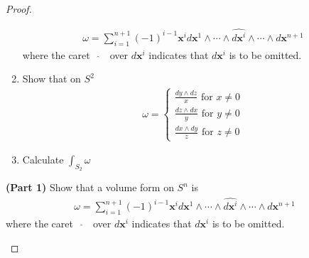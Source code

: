 \documentclass{report}
\begin{document}
\begin{proof}
\begin{question}{}{}
\begin{enumerate}[label=(\alph*)]
\begin{align*}
    \omega = \sum_{i=1}^{n+1}(-1)^{i-1}\textbf{x}^i d\textbf{x}^1 \wedge \cdots \wedge  \widehat{d\textbf{x}^i} \wedge  \cdots \wedge d\textbf{x}^{n+1}       
    \end{align*}
  where the caret $\text{  }\widehat{}\text{  }$ over $d\textbf{x}^i$ indicates that $d\textbf{x}^i$ is to be omitted. 
  \item Show that on $S^2$ 
 \begin{align*}
 \omega= \begin{cases}
   \frac{dy \wedge  dz}{x}\text{ for }x\neq 0\\
   \frac{dz \wedge  dx}{y}\text{ for }y\neq 0\\
   \frac{dx \wedge  dy}{z}\text{ for }z\neq 0
 \end{cases}
 \end{align*}
 \item Calculate $\int_{S_2}\omega$
\end{enumerate}
\end{question}
\begin{theorem}
\textbf{(Part 1)} Show that a volume form on $S^n$ is 
     \begin{align*}
    \omega = \sum_{i=1}^{n+1}(-1)^{i-1}\textbf{x}^i d\textbf{x}^1 \wedge \cdots \wedge  \widehat{d\textbf{x}^i} \wedge  \cdots \wedge d\textbf{x}^{n+1}       
    \end{align*}
  where the caret $\text{  }\widehat{}\text{  }$ over $d\textbf{x}^i$ indicates that $d\textbf{x}^i$ is to be omitted. 


\end{theorem}
\end{proof}
\end{document}
